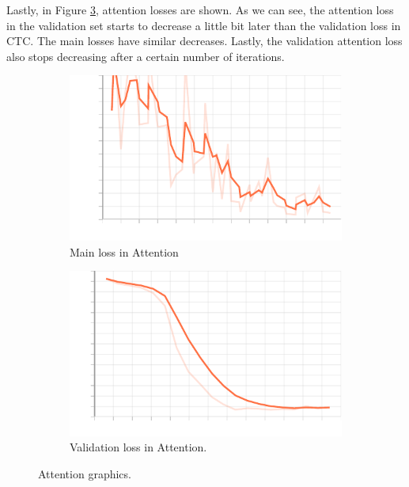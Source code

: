 \documentclass[a4paper]{article}
\begin{document}
\begin{itemize}
        Lastly, in Figure \ref{fig:att:res}, attention losses are shown. As we can see, the attention loss in the validation set starts to decrease a little bit later than the validation loss in CTC. The main losses have similar decreases. Lastly, the validation attention loss also stops decreasing after a certain number of iterations.


        \begin{figure}[H]
          \centering
          \begin{subfigure}[b]{0.45\textwidth}
            \centering
            \includegraphics[width=\textwidth]{Figures/main_loss_att}
            \caption{Main loss in Attention}
            \label{fig:att:main:loss}
          \end{subfigure}
          \hfill
          \begin{subfigure}[b]{0.45\textwidth}
            \centering
            \includegraphics[width=\textwidth]{Figures/validation_main_loss_att}
            \caption{Validation loss in Attention.}
            \label{fig:att:validation:loss}
          \end{subfigure}
          \caption{Attention graphics.}
          \label{fig:att:res}
        \end{figure}
\end{itemize}
\end{document}
